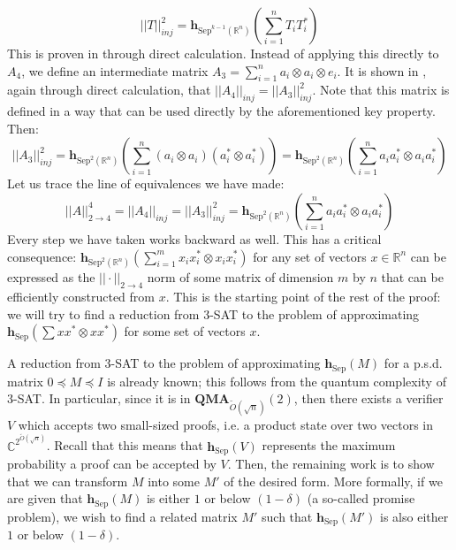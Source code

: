 \documentclass[10pt]{article}
\newcommand{\Sep}{\textrm{Sep}}
\newcommand{\C}{\mathbb{C}}
\newcommand{\R}{\mathbb{R}}
\newcommand{\mbf}[1]{\mathbf{ #1 }}
\begin{document}
$$||T||_{inj}^2 = \mbf{h}_{\Sep^{k-1}(\mathbb{R}^n)}\left(\sum_{i=1}^n T_iT_i^*\right)$$
This is proven in \cite{Barak} through direct calculation. Instead of applying this directly to $A_4$, we define an intermediate matrix $A_3 = \sum_{i=1}^n a_i \otimes a_i \otimes e_i$. It is shown in \cite{Barak}, again through direct calculation, that $||A_4||_{inj} = ||A_3||_{inj}^2$. Note that this matrix is defined in a way that can be used directly by the aforementioned key property. Then:
$$||A_3||_{inj}^2 = \mbf{h}_{\Sep^2(\mathbb{R}^n)}\left( \sum_{i=1}^n (a_i \otimes a_i)(a_i^* \otimes a_i^*) \right) = \mbf{h}_{\Sep^2(\mathbb{R}^n)}\left( \sum_{i=1}^n a_ia_i^* \otimes a_ia_i^* \right)$$
Let us trace the line of equivalences we have made:
$$||A||_{2 \to 4}^4 = ||A_4||_{inj} = ||A_3||_{inj}^2 = \mbf{h}_{\Sep^2(\R^n)}\left( \sum_{i=1}^n a_ia_i^* \otimes a_ia_i^* \right)$$
Every step we have taken works backward as well. This has a critical consequence: $\mbf{h}_{\Sep^2(\mathbb{R}^n)} \left( \sum_{i=1}^m x_ix_i^* \otimes x_ix_i^* \right)$ for any set of vectors $x \in \mathbb{R}^n$ can be expressed as the $||\cdot||_{2 \to 4}$ norm of some matrix of dimension $m$ by $n$ that can be efficiently constructed from $x$. This is the starting point of the rest of the proof: we will try to find a reduction from 3-SAT to the problem of approximating $\mbf{h}_{\Sep}(\sum xx^* \otimes xx^*)$ for some set of vectors $x$. 

A reduction from 3-SAT to the problem of approximating $\mbf{h}_{\Sep}(M)$ for a p.s.d. matrix $0 \preceq M \preceq I$ is already known; this follows from the quantum complexity of 3-SAT. In particular, since it is in $\textbf{QMA}_{\tilde{O}(\sqrt{n})}(2)$, then there exists a verifier $V$ which accepts two small-sized proofs, i.e. a product state over two vectors in $\C^{2^{\tilde{O}(\sqrt{n})}}$. Recall that this means that $\mbf{h}_{\Sep}(V)$ represents the maximum probability a proof can be accepted by $V$.
Then, the remaining work is to show that we can transform $M$ into some $M'$ of the desired form. More formally, if we are given that $\mbf{h}_{\Sep}(M)$ is either $1$ or below $(1-\delta)$ (a so-called promise problem), we wish to find a related matrix $M'$ such that $\mbf{h}_{\Sep}(M')$ is also either $1$ or below $(1-\delta)$.
\end{document}
